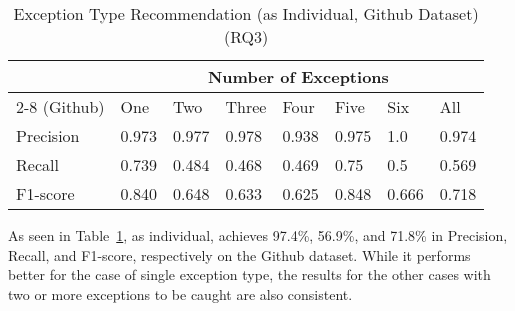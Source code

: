 \begin{table}[t]%
  \caption{Exception Type Recommendation (\xtype as Individual, Github Dataset) (RQ3)}
  \vspace{-12pt}
  \small
	\begin{center}
		\renewcommand{\arraystretch}{1}
		\begin{tabular}{| p{1.2cm}<{\centering} | p{0.6cm}<{\centering} | p{0.6cm}<{\centering}| p{0.6cm}<{\centering} | p{0.6cm}<{\centering} | p{0.6cm}<{\centering} | p{0.6cm}<{\centering} | p{0.6cm}<{\centering} |}
		  \hline
			\multirow{2}{*}{{\xtype}} & \multicolumn{7}{c|}{Number of Exceptions} \\
			\cline{2-8}
			(Github) & One & Two & Three & Four & Five & Six & All\\
			\hline
			Precision &  0.973 & 0.977 & 0.978 & 0.938 & 0.975 & 1.0 & 0.974\\
			\hline
			Recall &  0.739 & 0.484 & 0.468 & 0.469 & 0.75 & 0.5 & 0.569\\
			\hline
			F1-score &  0.840 & 0.648 & 0.633 & 0.625 & 0.848 & 0.666 & 0.718\\
			\hline
		\end{tabular}
		\label{tab:xtype-1}
	\end{center}
\end{table}

As seen in Table~\ref{tab:xtype-1}, as individual, {\xtype}
achieves 97.4\%, 56.9\%, and 71.8\% in Precision, Recall, and
F1-score, respectively on the Github dataset. While it performs better
for the case of single exception type, the results for the other cases
with two or more exceptions to be caught are also consistent.
